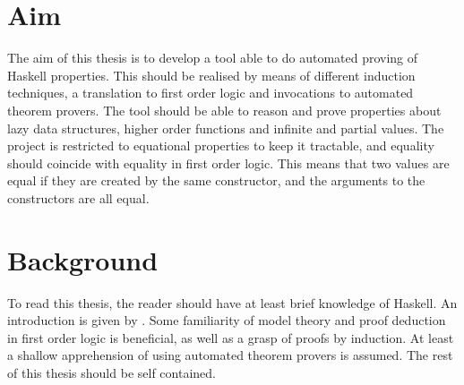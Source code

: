 \section{Aim}

The aim of this thesis is to develop a tool able to do automated
proving of Haskell properties. This should be realised by means of
different induction techniques, a translation to first order logic and
invocations to automated theorem provers. The tool should be able to
reason and prove properties about lazy data structures, higher order
functions and infinite and partial values. The project is restricted
to equational properties to keep it tractable, and equality should
coincide with equality in first order logic. This means that two
values are equal if they are created by the same constructor, and the
arguments to the constructors are all equal.

\section{Background}

To read this thesis, the reader should have at least brief knowledge
of Haskell. An introduction is given by \cite{lyah}. Some familiarity
of model theory and proof deduction in first order logic is
beneficial, as well as a grasp of proofs by induction. At least a
shallow apprehension of using automated theorem provers is assumed.
The rest of this thesis should be self contained.











































\begin{comment}
INTRODUCTION - State your thesis and the purpose of your research
paper clearly. What is the chief reason you are writing the paper?
State also how you plan to approach your topic. Is this a factual
report, a book review, a comparison, or an analysis of a problem?
Explain briefly the major points you plan to cover in your paper and
why readers should be interested in your topic.
\end{comment}



